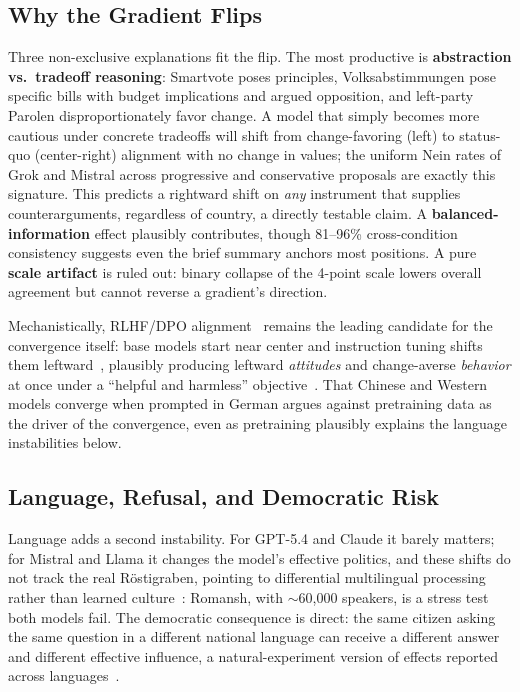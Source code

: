 \documentclass[11pt]{article}
\begin{document}
\subsection{Why the Gradient Flips}

Three non-exclusive explanations fit the flip.
The most productive is \textbf{abstraction vs.\ tradeoff reasoning}: Smartvote poses principles, Volksabstimmungen pose specific bills with budget implications and argued opposition, and left-party Parolen disproportionately favor change.
A model that simply becomes more cautious under concrete tradeoffs will shift from change-favoring (left) to status-quo (center-right) alignment with no change in values; the uniform Nein rates of Grok and Mistral across progressive and conservative proposals are exactly this signature.
This predicts a rightward shift on \emph{any} instrument that supplies counterarguments, regardless of country, a directly testable claim.
A \textbf{balanced-information} effect plausibly contributes, though 81--96\% cross-condition consistency suggests even the brief summary anchors most positions.
A pure \textbf{scale artifact} is ruled out: binary collapse of the 4-point scale lowers overall agreement but cannot reverse a gradient's direction.

Mechanistically, RLHF/DPO alignment~\citep{ouyang2022training, rafailov2023direct} remains the leading candidate for the convergence itself: base models start near center and instruction tuning shifts them leftward~\citep{faulborn2025only, rozado2024political, potter2024hidden}, plausibly producing leftward \emph{attitudes} and change-averse \emph{behavior} at once under a ``helpful and harmless'' objective~\citep{bai2022training}.
That Chinese and Western models converge when prompted in German argues against pretraining data as the driver of the convergence, even as pretraining plausibly explains the language instabilities below.

\subsection{Language, Refusal, and Democratic Risk}

Language adds a second instability.
For GPT-5.4 and Claude it barely matters; for Mistral and Llama it changes the model's effective politics, and these shifts do not track the real R\"{o}stigraben, pointing to differential multilingual processing rather than learned culture~\citep{pakistani2025framing}: Romansh, with $\sim$60{,}000 speakers, is a stress test both models fail.
The democratic consequence is direct: the same citizen asking the same question in a different national language can receive a different answer and different effective influence, a natural-experiment version of effects reported across languages~\citep{nadeem2026bias, languageyouask2026}.
\end{document}
